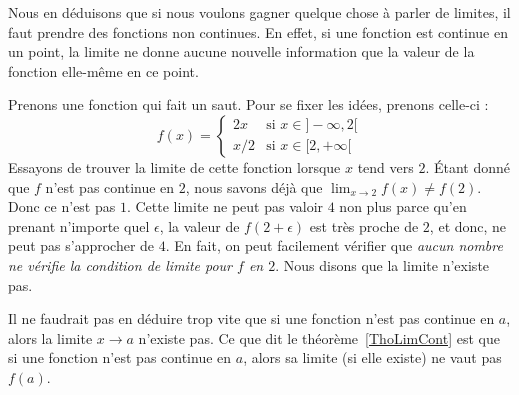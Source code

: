 Nous en déduisons que si nous voulons gagner quelque chose à parler de limites, il faut prendre des fonctions non continues. En effet, si une fonction est continue en un point, la limite ne donne aucune nouvelle information que la valeur de la fonction elle-même en ce point.

Prenons une fonction qui fait un saut. Pour se fixer les idées, prenons celle-ci :
\begin{equation}    \label{EqnCtOEL}
	f(x)=
	\begin{cases}
		2x  & \text{si }x\in]-\infty,2[ \\
		x/2 & \text{si }x\in[2,+\infty[
	\end{cases}
\end{equation}
Essayons de trouver la limite de cette fonction lorsque \( x\) tend vers \( 2\). Étant donné que \( f\) n'est pas continue en \( 2\), nous savons déjà que \( \lim_{x\to 2}f(x)\neq f(2)\). Donc ce n'est pas \( 1\). Cette limite ne peut pas valoir \( 4\) non plus parce qu'en prenant n'importe quel \( \epsilon\), la valeur de \( f(2+\epsilon)\) est très proche de \( 2\), et donc, ne peut pas s'approcher de \( 4\). En fait, on peut facilement vérifier que \emph{aucun nombre ne vérifie la condition de limite pour \( f\) en \( 2\)}. Nous disons que la limite n'existe pas.

Il ne faudrait pas en déduire trop vite que si une fonction n'est pas continue en \( a\), alors la limite \( x\to a\) n'existe pas. Ce que dit le théorème~\ref{ThoLimCont} est que si une fonction n'est pas continue en \( a\), alors sa limite (si elle existe) ne vaut pas \( f(a)\).

